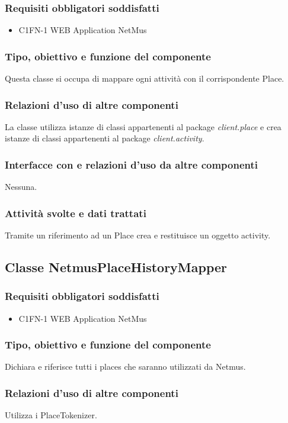 \subsubsection*{Requisiti obbligatori soddisfatti}
\begin{itemize}
	\item C1FN-1 WEB Application NetMus
\end{itemize}
\subsubsection*{Tipo, obiettivo e funzione del componente}
Questa classe si occupa di mappare ogni attivit\`a con il corrispondente Place.
\subsubsection*{Relazioni d'uso di altre componenti}
La classe utilizza istanze di classi appartenenti al package
\emph{client.place} e crea istanze di classi appartenenti al package
\emph{client.activity}.
\subsubsection*{Interfacce con e relazioni d'uso da altre
componenti} Nessuna.
\subsubsection*{Attivit\`a svolte e dati trattati}
Tramite un riferimento ad un Place crea e restituisce un oggetto activity.

\subsection{Classe NetmusPlaceHistoryMapper}
\subsubsection*{Requisiti obbligatori soddisfatti}
\begin{itemize}
	\item C1FN-1 WEB Application NetMus
\end{itemize}
\subsubsection*{Tipo, obiettivo e funzione del componente}
Dichiara e riferisce tutti i places che saranno utilizzati da Netmus.
\subsubsection*{Relazioni d'uso di altre componenti}
Utilizza i PlaceTokenizer.
